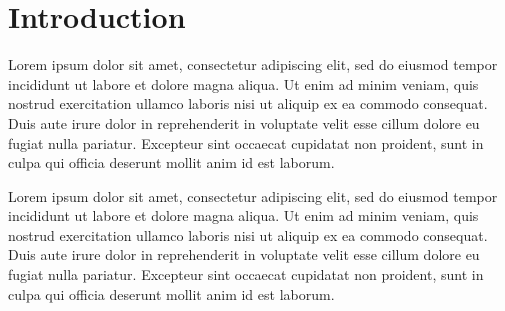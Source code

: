 
\section{Introduction}
\label{sec: backg}

Lorem ipsum dolor sit amet, consectetur adipiscing elit, sed do eiusmod tempor incididunt ut labore et dolore magna aliqua. Ut enim ad minim veniam, quis nostrud exercitation ullamco laboris nisi ut aliquip ex ea commodo consequat. Duis aute irure dolor in reprehenderit in voluptate velit esse cillum dolore eu fugiat nulla pariatur. Excepteur sint occaecat cupidatat non proident, sunt in culpa qui officia deserunt mollit anim id est laborum.

Lorem ipsum dolor sit amet, consectetur adipiscing elit, sed do eiusmod tempor incididunt ut labore et dolore magna aliqua. Ut enim ad minim veniam, quis nostrud exercitation ullamco laboris nisi ut aliquip ex ea commodo consequat. Duis aute irure dolor in reprehenderit in voluptate velit esse cillum dolore eu fugiat nulla pariatur. Excepteur sint occaecat cupidatat non proident, sunt in culpa qui officia deserunt mollit anim id est laborum.


